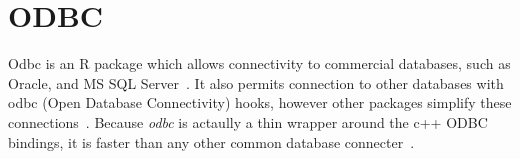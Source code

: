 \section{ODBC}

Odbc is an R package which allows connectivity to commercial
databases, such as Oracle, and MS SQL
Server~\cite{hid-sp18-403-R-odbc}. It also permits connection to other
databases with odbc  (Open Database Connectivity) hooks, however other
packages simplify these connections~\cite{hid-sp18-403-R-dbi}.
Because \textit{odbc} is actaully a thin wrapper around the c++ ODBC
bindings, it is faster than any other common database
connecter~\cite{hid-sp18-403-rstudio-odbc}.
